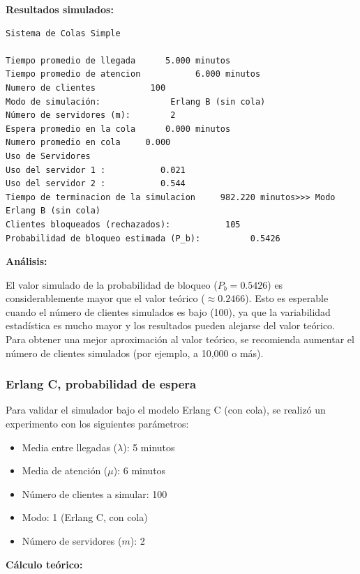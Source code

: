 \documentclass{article}
\begin{document}
\textbf{Resultados simulados:}

\begin{verbatim}
Sistema de Colas Simple

Tiempo promedio de llegada      5.000 minutos
Tiempo promedio de atencion           6.000 minutos
Numero de clientes           100
Modo de simulación:              Erlang B (sin cola)
Número de servidores (m):        2
Espera promedio en la cola      0.000 minutos
Numero promedio en cola     0.000
Uso de Servidores
Uso del servidor 1 :           0.021
Uso del servidor 2 :           0.544
Tiempo de terminacion de la simulacion     982.220 minutos>>> Modo Erlang B (sin cola)
Clientes bloqueados (rechazados):           105
Probabilidad de bloqueo estimada (P_b):          0.5426
\end{verbatim}

\textbf{Análisis:}

El valor simulado de la probabilidad de bloqueo ($P_b = 0.5426$) es considerablemente mayor que el valor teórico ($\approx 0.2466$). Esto es esperable cuando el número de clientes simulados es bajo (100), ya que la variabilidad estadística es mucho mayor y los resultados pueden alejarse del valor teórico. Para obtener una mejor aproximación al valor teórico, se recomienda aumentar el número de clientes simulados (por ejemplo, a 10,000 o más).

\subsubsection{Erlang C, probabilidad de espera}\label{subsec:erlang_c_prob_espe}

Para validar el simulador bajo el modelo Erlang C (con cola), se realizó un experimento con los siguientes parámetros:

\begin{itemize}
    \item Media entre llegadas ($\lambda$): 5 minutos
    \item Media de atención ($\mu$): 6 minutos
    \item Número de clientes a simular: 100
    \item Modo: 1 (Erlang C, con cola)
    \item Número de servidores ($m$): 2
\end{itemize}

\textbf{Cálculo teórico:}
\end{document}
